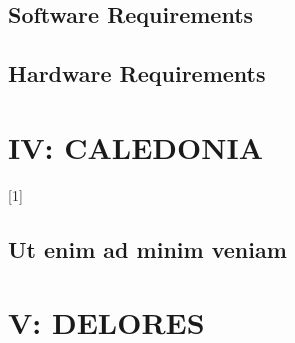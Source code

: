 \section{Software Requirements}

\section{Hardware Requirements}









\chapter{IV: CALEDONIA}

\begin{chapterabstract}
	\lipsum[1]
\end{chapterabstract}

\lipsum[2][1-4]{} [1]

\lipsum[4]

\section{Ut enim ad minim veniam}









\chapter{V: DELORES}

